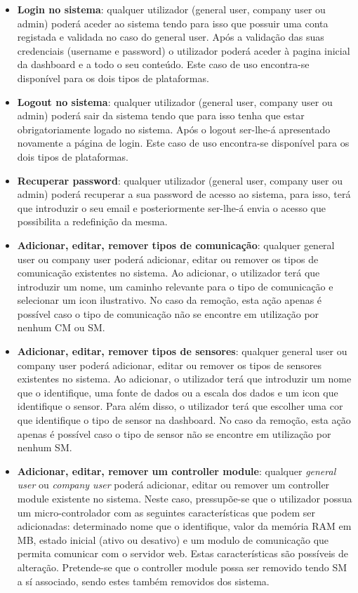 \newpage
\begin{itemize}
	\item \textbf{Login no sistema}: qualquer utilizador (general user, company user ou admin) poderá aceder ao sistema tendo para isso que possuir uma conta registada e validada no caso do general user. Após a validação das suas credenciais (username e password) o utilizador poderá aceder à pagina inicial da dashboard e a todo o seu conteúdo. Este caso de uso encontra-se disponível para os dois tipos de plataformas. 
	
	
	\item \textbf{Logout no sistema}: qualquer utilizador (general user, company user ou admin) poderá sair da sistema tendo que para isso tenha que estar obrigatoriamente logado no sistema. Após o logout ser-lhe-á apresentado novamente a página de login. Este caso de uso encontra-se disponível para os dois tipos de plataformas. 
	
	
	\item \textbf{Recuperar password}: qualquer utilizador (general user, company user ou admin) poderá recuperar a sua password de acesso ao sistema, para isso, terá que introduzir o seu email e posteriormente ser-lhe-á envia o acesso que possibilita a redefinição da mesma. 
	
	
	
	\item \textbf{Adicionar, editar, remover tipos de comunicação}: qualquer general user ou company user poderá adicionar, editar ou remover os tipos de comunicação existentes no sistema. Ao  adicionar, o utilizador terá que introduzir um nome, um caminho relevante para o tipo de comunicação e selecionar um icon ilustrativo. No caso da remoção, esta ação apenas é possível caso o tipo de comunicação não se encontre em utilização por nenhum \ac{CM} ou \ac{SM}.  
	
	\item \textbf{Adicionar, editar, remover tipos de sensores}: qualquer general user ou company user poderá adicionar, editar ou remover os tipos de sensores existentes no sistema. Ao  adicionar, o utilizador terá que introduzir um nome que o identifique, uma fonte de dados ou a escala dos dados  e um icon que identifique o sensor. Para além disso, o utilizador terá que escolher uma cor que identifique o tipo de sensor na dashboard. No caso da remoção, esta ação apenas é possível caso o tipo de sensor não se encontre em utilização por nenhum \ac{SM}.   
	 
	
	\item \textbf{Adicionar, editar, remover um controller module}: qualquer \textit{general user} ou \textit{company user} poderá adicionar, editar ou remover um controller module existente no sistema. Neste caso, pressupõe-se que o utilizador possua um micro-controlador com as seguintes características que podem ser adicionadas: determinado nome que o identifique, valor da memória RAM em MB, estado inicial (ativo ou desativo) e um modulo de comunicação que permita comunicar com o servidor web. Estas características são possíveis de alteração. Pretende-se que o controller module possa ser removido tendo \ac{SM} a sí associado, sendo estes também removidos dos sistema. 



\end{itemize}

